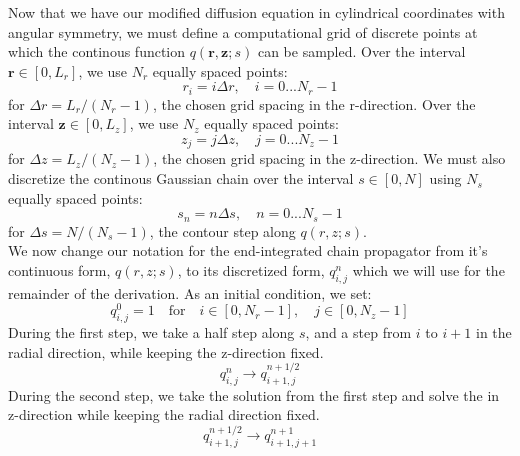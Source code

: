 \documentclass[11pt]{article} %
\begin{document}
Now that we have our modified diffusion equation in cylindrical coordinates with angular symmetry, we must define a computational grid of discrete points at which the continous function $q(\textbf{r},\textbf{z};s)$ can be sampled. Over the interval $\textbf{r} \in [0,L_r]$, we use $N_r$ equally spaced points:
\begin{equation}
r_i = i \Delta r, \quad i = 0 ... N_r - 1
\end{equation}
\noindent
for $\Delta r = L_r/(N_r-1)$, the chosen grid spacing in the r-direction. Over the interval $\textbf{z} \in [0,L_z]$, we use $N_z$ equally spaced points:
\begin{equation}
z_j = j \Delta z, \quad j = 0 ... N_z - 1
\end{equation}
\noindent
for $\Delta z = L_z/(N_z-1)$, the chosen grid spacing in the z-direction. We must also discretize the continous Gaussian chain over the interval $s \in [0,N]$ using $N_s$ equally spaced points:
\begin{equation}
s_n = n \Delta s, \quad n = 0 ... N_s -1
\end{equation}
\noindent
for $\Delta s = N/(N_s-1)$, the contour step along $q(r,z;s)$. \\[12pt]


 We now change our notation for the end-integrated chain propagator from it's continuous form, $q(r,z;s)$, to its discretized form, $q_{i,j}^n$ which we will use for the remainder of the derivation. As an initial condition, we set:
\begin{equation}
q_{i,j}^0 = 1 \quad \text{for} \quad i \in [0,N_r-1], \quad j \in [0,N_z-1]
\end{equation}
\noindent
During the first step, we take a half step along $s$, and a step from $i$ to $i+1$ in the radial direction, while keeping the z-direction fixed.
\begin{equation}
q_{i,j}^n \rightarrow q_{i+1,j}^{n+1/2}
\end{equation}
\noindent
During the second step, we take the solution from the first step and solve the in z-direction while keeping the radial direction fixed.
\begin{equation}
q_{i+1,j}^{n+1/2} \rightarrow q_{i+1,j+1}^{n+1}
\end{equation}
 
\end{document}

